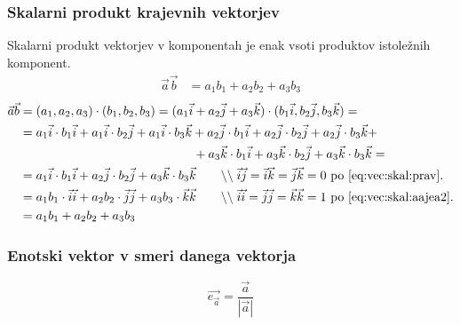 \documentclass[a4paper,oneside,12pt,fleqn]{article}
\newcommand\krat\cdot
\newcommand{\comment}[1]{\ensuremath{\qquad\backslash\backslash\;}\textnormal{#1}}
\def\Vec{\overrightarrow}
\numberwithin{equation}{section}
\begin{document}
\subsubsection{Skalarni produkt krajevnih vektorjev}
\label{sec:vec:kraj:skal}
Skalarni produkt vektorjev v komponentah je enak vsoti produktov istoležnih komponent.
\boldmath
\begin{align*}
  \vec{a}\vec{b} &=  a_1b_1+a_2b_2+a_3b_3
\end{align*}
\unboldmath
\begin{align*}
  \vec{a}\vec{b} &=  (a_1,a_2,a_3)\krat(b_1,b_2,b_3) = (a_1\vec{i} + a_2\vec{j} +
  a_3\vec{k}) \krat (b_1\vec{i},b_2\vec{j},b_3\vec{k}) = \\
  &= a_1\vec{i}\krat b_1\vec{i} + a_1\vec{i}\krat b_2\vec{j} + a_1\vec{i}\krat b_3\vec{k}
  + a_2\vec{j}\krat b_1\vec{i} + a_2\vec{j}\krat b_2\vec{j} + a_2\vec{j}\krat b_3\vec{k} +
  \\ & \qquad \qquad \qquad \qquad \qquad \qquad \qquad + a_3\vec{k}\krat b_1\vec{i} + a_3\vec{k}\krat b_2\vec{j} + a_3\vec{k}\krat b_3\vec{k} = \\
  &= a_1\vec{i}\krat b_1\vec{i} + a_2\vec{j}\krat b_2\vec{j} + a_3\vec{k}\krat b_3\vec{k}
  \comment{$\vec{i}\vec{j} = \vec{i}\vec{k} = \vec{j}\vec{k} = 0$ po
  \eqref{eq:vec:skal:prav}.} \\
  &= a_1b_1\krat\vec{i}\vec{i} + a_2b_2\krat\vec{j}\vec{j} + a_3b_3\krat\vec{k}\vec{k}
  \comment{$\vec{i}\vec{i} = \vec{j}\vec{j} = \vec{k}\vec{k} = 1$ po
  \eqref{eq:vec:skal:aajea2}.} \\
  &= a_1b_1 + a_2b_2 + a_3b_3
\end{align*}

\subsubsection{Enotski vektor v smeri danega vektorja}
\label{sec:vec:kraj:enot}
\[ \Vec{e_{\vec{a}}} = \frac{\vec{a}}{\left| \vec{a} \right|} \]
\end{document}
